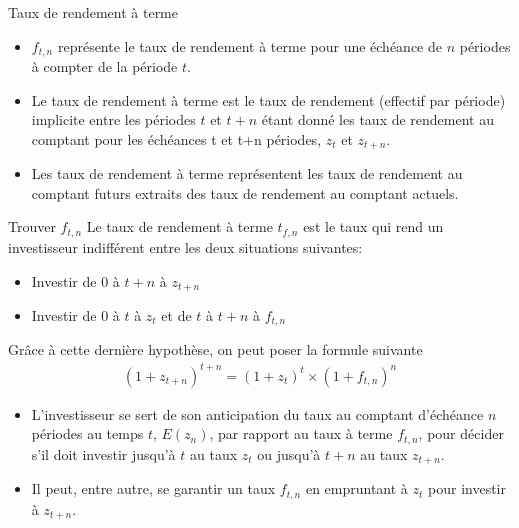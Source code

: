 \documentclass[11pt]{beamer}
\begin{document}
\begin{frame}{Taux de rendement à terme}
\begin{itemize}
\item $f_{t,n}$ représente le taux de rendement à terme pour une échéance de $n$ périodes à compter de la période $t$.  
\item Le taux de rendement à terme est le taux de rendement (effectif par période) implicite entre les périodes $t$ et $t+n$ étant donné les taux de rendement au comptant pour les échéances t et t+n périodes,  $z_t$ et $z_{t+n}$.
\item Les taux de rendement à terme représentent les taux de rendement au comptant futurs extraits des taux de rendement au comptant actuels.
\end{itemize}
\end{frame}
\begin{frame}{Trouver $f_{t,n}$}
Le taux de rendement à terme $t_{f,n}$ est le taux qui rend un investisseur indifférent entre les deux situations suivantes:
\begin{itemize}
\item Investir de $0$ à $t+n$ à $z_{t+n}$
\item Investir de $0$ à $t$ à $z_t$ et de $t$ à $t+n$ à $f_{t,n}$
\end{itemize}
Grâce à cette dernière hypothèse, on peut poser la formule suivante
\begin{align*}
(1+z_{t+n})^{t+n}=(1+z_t)^t \times (1+f_{t,n})^n
\end{align*}
\begin{itemize}
\item L’investisseur se sert de son anticipation du taux au comptant d’échéance $n$ périodes au temps $t$,  $E(z_n)$,  par rapport au taux à terme $f_{t,n}$,  pour décider s’il doit investir jusqu’à $t$ au taux $z_t$ ou jusqu’à $t+n$ au taux $z_{t+n}$.  
\item  Il peut,  entre autre,  se garantir un taux $f_{t,n}$ en empruntant à $z_t$ pour investir à $z_{t+n}$.
\end{itemize}
\end{frame}
\end{document}
